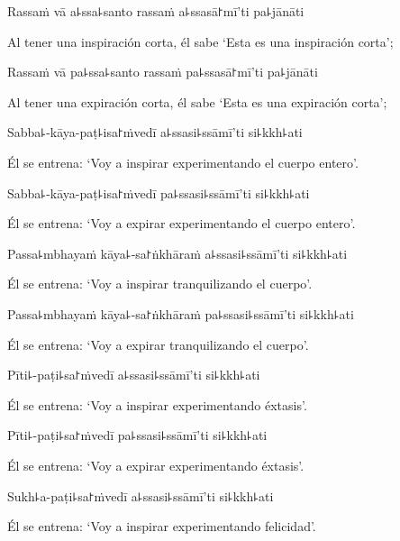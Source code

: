Rassaṁ vā a꜕ssa꜕santo rassaṁ a꜕ssasā꜓mī'ti pa꜕jānāti

\begin{english}
  Al tener una inspiración corta, él sabe `Esta es una inspiración corta';
\end{english}

Rassaṁ vā pa꜕ssa꜕santo rassaṁ pa꜕ssasā꜓mī'ti pa꜕jānāti

\begin{english}
  Al tener una expiración corta, él sabe `Esta es una expiración corta';
\end{english}

Sabba꜕-kāya-paṭ꜕isa꜓ṁvedī a꜕ssasi꜕ssāmī'ti si꜕kkh꜕ati

\begin{english}
  Él se entrena: `Voy a inspirar experimentando el cuerpo entero'.
\end{english}

Sabba꜕-kāya-paṭ꜕isa꜓ṁvedī pa꜕ssasi꜕ssāmī'ti si꜕kkh꜕ati

\begin{english}
  Él se entrena: `Voy a expirar experimentando el cuerpo entero'.
\end{english}

Passa꜕mbhayaṁ kāya꜕-sa꜓ṅkhāraṁ a꜕ssasi꜕ssāmī'ti si꜕kkh꜕ati

\begin{english}
  Él se entrena: `Voy a inspirar tranquilizando el cuerpo'.
\end{english}

Passa꜕mbhayaṁ kāya꜕-sa꜓ṅkhāraṁ pa꜕ssasi꜕ssāmī'ti si꜕kkh꜕ati

\begin{english}
  Él se entrena: `Voy a expirar tranquilizando el cuerpo'.
\end{english}

Pīti꜕-paṭi꜕sa꜓ṁvedī a꜕ssasi꜕ssāmī'ti si꜕kkh꜕ati

\begin{english}
  Él se entrena: `Voy a inspirar experimentando éxtasis'.
\end{english}

Pīti꜕-paṭi꜕sa꜓ṁvedī pa꜕ssasi꜕ssāmī'ti si꜕kkh꜕ati

\begin{english}
  Él se entrena: `Voy a expirar experimentando éxtasis'.
\end{english}

Sukh꜕a-paṭi꜕sa꜓ṁvedī a꜕ssasi꜕ssāmī'ti si꜕kkh꜕ati

\begin{english}
  Él se entrena: `Voy a inspirar experimentando felicidad'.
\end{english}

